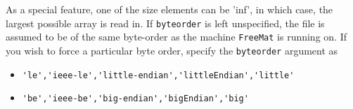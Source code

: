 As a special feature, one of the size elements can be 'inf', 
in which case, the largest possible array is read in.
If \verb|byteorder| is left unspecified, the file is assumed to be
of the same byte-order as the machine \verb|FreeMat| is running on.
If you wish to force a particular byte order, specify the \verb|byteorder|
argument as
\begin{itemize}
\item  \verb|'le','ieee-le','little-endian','littleEndian','little'|

\item  \verb|'be','ieee-be','big-endian','bigEndian','big'|

\end{itemize}
